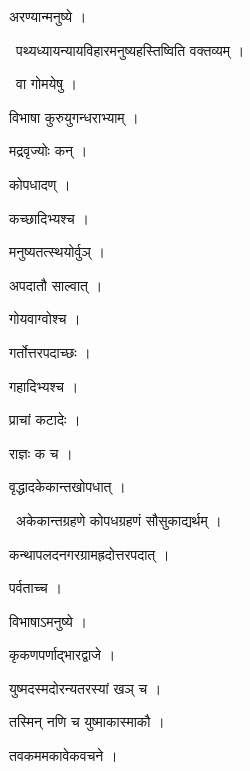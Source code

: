 \documentclass[10pt, openany, oneside]{book}
\begin{document}
\noindent अरण्यान्मनुष्ये ।

\par\noindent\hspace{1.5em}{\vps वा॰}~{\qt पथ्यध्यायन्यायविहारमनुष्यहस्तिष्विति वक्तव्यम् ।}

\par\noindent\hspace{1.5em}{\vps वा॰}~{\qt वा गोमयेषु ।}

\noindent विभाषा कुरुयुगन्धराभ्याम् ।

\noindent मद्रवृज्योः कन् ।

\noindent कोपधादण् ।

\noindent कच्छादिभ्यश्च ।

\noindent मनुष्यतत्स्थयोर्वुञ् ।

\noindent अपदातौ साल्वात् ।

\noindent गोयवाग्वोश्च ।

\noindent गर्तोत्तरपदाच्छः ।

\noindent गहादिभ्यश्च ।

\noindent प्राचां कटादेः ।

\noindent राज्ञः क च ।

\noindent वृद्धादकेकान्तखोपधात् ।

\par\noindent\hspace{1.5em}{\vps वा॰}~{\qt अकेकान्तग्रहणे कोपधग्रहणं सौसुकाद्यर्थम् ।}

\noindent कन्थापलदनगरग्रामह्रदोत्तरपदात् ।

\noindent पर्वताच्च ।

\noindent विभाषाऽमनुष्ये ।

\noindent कृकणपर्णाद्भारद्वाजे ।

\noindent युष्मदस्मदोरन्यतरस्यां खञ् च ।

\noindent तस्मिन् नणि च युष्माकास्माकौ ।

\noindent तवकममकावेकवचने ।
\end{document}
